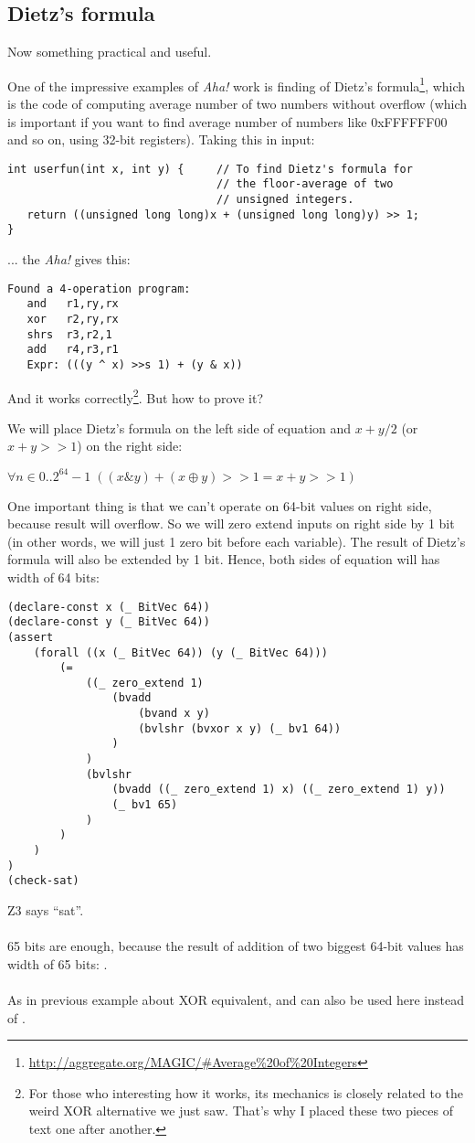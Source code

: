 \subsection{Dietz's formula}

Now something practical and useful.

One of the impressive examples of \textit{Aha!} work is finding of Dietz's formula\footnote{\url{http://aggregate.org/MAGIC/\#Average\%20of\%20Integers}},
which is the code of computing average number of two numbers without overflow (which is important if you want to find average number of numbers like 0xFFFFFF00 and so on, using 32-bit registers).
Taking this in input:

\begin{lstlisting}
int userfun(int x, int y) {     // To find Dietz's formula for
                                // the floor-average of two
                                // unsigned integers.
   return ((unsigned long long)x + (unsigned long long)y) >> 1;
}
\end{lstlisting}

... the \textit{Aha!} gives this:

\begin{lstlisting}
Found a 4-operation program:
   and   r1,ry,rx
   xor   r2,ry,rx
   shrs  r3,r2,1
   add   r4,r3,r1
   Expr: (((y ^ x) >>s 1) + (y & x))
\end{lstlisting}

And it works correctly\footnote{For those who interesting how it works, its mechanics is closely related to the weird XOR alternative we just saw.
That's why I placed these two pieces of text one after another.}.
But how to prove it?

We will place Dietz's formula on the left side of equation and $x+y/2$ (or $x+y>>1$) on the right side:

\begin{center}
$\forall n \in 0..2^{64}-1\; ( (x\&y) + (x \oplus y)>>1 = x+y>>1)$
\end{center}

One important thing is that we can't operate on 64-bit values on right side, because result will overflow.
So we will zero extend inputs on right side by 1 bit (in other words, we will just 1 zero bit before each variable).
The result of Dietz's formula will also be extended by 1 bit.
Hence, both sides of equation will has width of 64 bits:

\begin{lstlisting}
(declare-const x (_ BitVec 64))
(declare-const y (_ BitVec 64))
(assert 
	(forall ((x (_ BitVec 64)) (y (_ BitVec 64)))
		(=
			((_ zero_extend 1)
				(bvadd
					(bvand x y)
					(bvlshr (bvxor x y) (_ bv1 64))
				)
			)
			(bvlshr
				(bvadd ((_ zero_extend 1) x) ((_ zero_extend 1) y))
				(_ bv1 65)
			)
		)
	)
)
(check-sat)
\end{lstlisting}

Z3 says ``sat''.\\
\\
65 bits are enough, because the result of addition of two biggest 64-bit values has width of 65 bits: .\\
\\
As in previous example about XOR equivalent,  and  can also be used here instead of .

